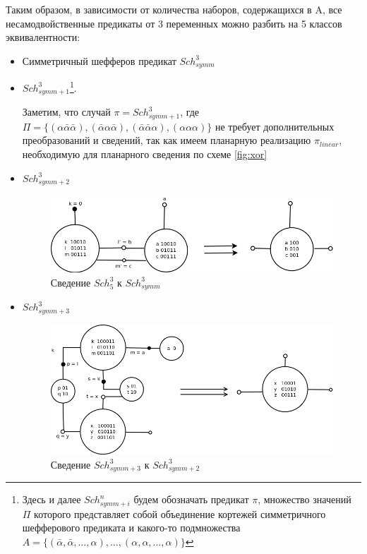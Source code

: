\documentclass[12pt]{article}
\begin{document}
Таким образом, в зависимости от количества наборов, содержащихся в A, все несамодвойственные
предикаты от 3 переменных можно разбить на 5 классов эквивалентности:
\begin{itemize}
\item{Симметричный шефферов предикат $Sch_{symm}^3$}
\item{$Sch_{symm+1}^3$\footnote{Здесь и далее $Sch_{symm+i}^n$ будем обозначать предикат $\pi$, множество значений $\Pi$
которого представляет собой объединение кортежей симметричного шефферового предиката и какого-то подмножества 
$A = \{ (\bar{\alpha}, \bar{\alpha}, \dots, \alpha), \dots, (\alpha, \alpha, \dots, \alpha) \} $}}.

Заметим, что случай $\pi=Sch_{symm+1}^3$, где 
$\Pi = \{ (\alpha\bar{\alpha}\bar{\alpha}), (\bar{\alpha}\alpha\bar{\alpha}), (\bar{\alpha}\bar{\alpha}\alpha), (\alpha\alpha\alpha)\}$ 
не требует дополнительных преобразований и сведений, так как имеем планарную реализацию
$\pi_{linear}$, необходимую для планарного сведения по схеме \ref{fig:xor}
\item{$Sch_{symm+2}^3$}
\begin{figure}[htb]
\centering
\includegraphics[width=1.0\textwidth]{3_2to3.png}
\caption{Сведение $Sch_5^3$ к $Sch_{symm}^3$ }
\label{fig:3_2to3}
\end{figure}
\item{$Sch_{symm+3}^3$}
\begin{figure}[htb]
\centering
\includegraphics[width=1.0\textwidth]{3_3to3_2.png}
\caption{Сведение $Sch_{symm+3}^3$ к $Sch_{symm+2}^3$}

\end{figure}
\end{itemize}
\end{document}
